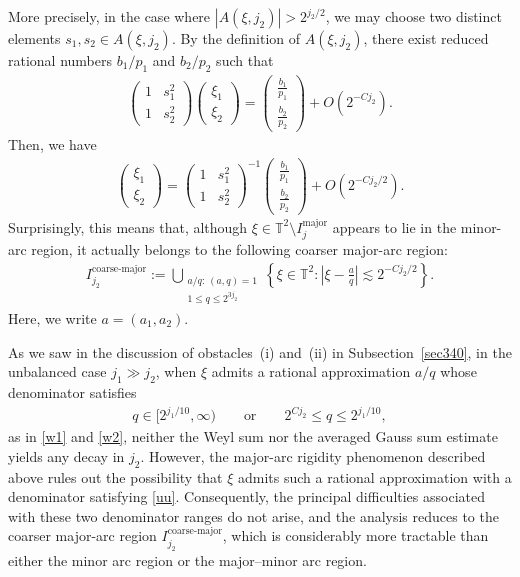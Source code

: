 \documentclass[10pt,a4paper]{amsart}
\numberwithin{equation}{section}
\begin{document}
 More precisely, in the case where $|A(\xi,j_2)|>2^{j_2/2}$, we may choose two distinct elements  $s_1,s_2\in A(\xi,j_2)$. By the definition of $A(\xi,j_2)$, there exist reduced rational numbers $b_1/p_1$ and $b_2/p_2$ such that
\begin{align*}
	\left(\begin{matrix}1&s_1^{2}\\
		1&s_2^{2}
	\end{matrix}\right) \left(\begin{matrix}\xi_{1}\\
		\xi_{2}
	\end{matrix}\right)=\left(\begin{matrix}\frac{b_1}{p_1}\\
		\frac{b_2}{p_2}
	\end{matrix}\right)+O(2^{-Cj_2}).
\end{align*}
Then, we have \begin{align*}
	 \left(\begin{matrix}\xi_{1}\\
		\xi_{2}
	\end{matrix}\right)=\left(\begin{matrix}1&s_1^{2}\\
	1&s_2^{2}
	\end{matrix}\right)^{-1}\left(\begin{matrix}\frac{b_1}{p_1}\\
		\frac{b_2}{p_2}
	\end{matrix}\right)+O(2^{-Cj_2/2}).
\end{align*}
Surprisingly, this means that, although
$\xi \in \mathbb{T}^2 \setminus I_j^{\mathrm{major}}$
appears to lie in the  minor-arc region, it actually belongs to the following coarser major-arc region:
\begin{align*}
	I_{j_2}^{\mathrm{coarse\text{-}major}}
	:=
	\bigcup_{\substack{a/q:\,(a,q)=1\\1\leq q\leq 2^{3j_2}}}
	\left\{
	\xi\in\mathbb{T}^2:
	\left|\xi-\frac{a}{q}\right|
	\lesssim 2^{-Cj_2/2}
	\right\}.
\end{align*}Here, we write $a=(a_1,a_2)$.




As we saw in the discussion of obstacles~(i) and~(ii) in Subsection~\ref{sec340}, in the unbalanced case $j_1\gg j_2$, when $\xi$ admits a rational approximation $a/q$ whose denominator satisfies \begin{align}\label{uu}
	 q\in[2^{j_1/10},\infty) \qquad\text{or}\qquad 2^{Cj_2}\leq q\leq 2^{j_1/10}, 
\end{align} as in \eqref{w1} and \eqref{w2}, neither the Weyl sum  nor the averaged Gauss sum estimate yields any decay in $j_2$. However, the major-arc rigidity phenomenon described above rules out the possibility that $\xi$ admits such a rational approximation with a denominator satisfying \eqref{uu}.  Consequently, the principal difficulties associated with these two denominator ranges do not arise, and the analysis reduces to the coarser major-arc region $I_{j_2}^{\mathrm{coarse\text{-}major}}$, which is considerably more tractable than either the minor arc region or the major--minor arc region.
\end{document}
